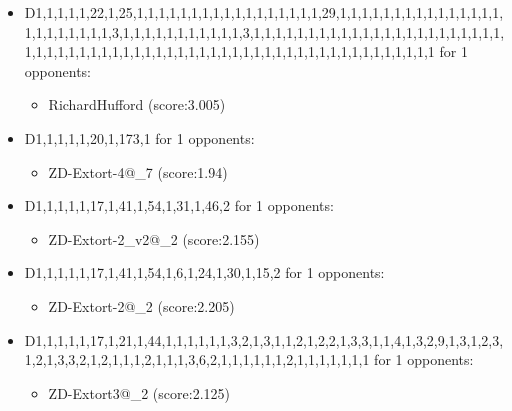 \begin{appendices}
\begin{itemize}
        \item D1,1,1,1,1,22,1,25,1,1,1,1,1,1,1,1,1,1,1,1,1,1,1,1,1,29,1,1,1,1,1,1,1,1,1,1,1,1,1,1,1,1,1,1,1,1,1,1,1,3,1,1,1,1,1,1,1,1,1,1,1,3,1,1,1,1,1,1,1,1,1,1,1,1,1,1,1,1,1,1,1,1,1,1,1,1,1,1,1,1,1,1,1,1,1,1,1,1,1,1,1,1,1,1,1,1,1,1,1,1,1,1,1,1,1,1,1,1,1,1,1,1,1 for 1 opponents:
        \begin{multicols}{3}
            \begin{itemize}
                \item RichardHufford (score:3.005)
            \end{itemize}
        \end{multicols}

        \item D1,1,1,1,1,20,1,173,1 for 1 opponents:
        \begin{multicols}{3}
            \begin{itemize}
                \item ZD-Extort-4@\_7 (score:1.94)
            \end{itemize}
        \end{multicols}

        \item D1,1,1,1,1,17,1,41,1,54,1,31,1,46,2 for 1 opponents:
        \begin{multicols}{3}
            \begin{itemize}
                \item ZD-Extort-2\_v2@\_2 (score:2.155)
            \end{itemize}
        \end{multicols}

        \item D1,1,1,1,1,17,1,41,1,54,1,6,1,24,1,30,1,15,2 for 1 opponents:
        \begin{multicols}{3}
            \begin{itemize}
                \item ZD-Extort-2@\_2 (score:2.205)
            \end{itemize}
        \end{multicols}

        \item D1,1,1,1,1,17,1,21,1,44,1,1,1,1,1,1,3,2,1,3,1,1,2,1,2,2,1,3,3,1,1,4,1,3,2,9,1,3,1,2,3,1,2,1,3,3,2,1,2,1,1,1,2,1,1,1,3,6,2,1,1,1,1,1,1,2,1,1,1,1,1,1,1 for 1 opponents:
        \begin{multicols}{3}
            \begin{itemize}
                \item ZD-Extort3@\_2 (score:2.125)
            \end{itemize}
        \end{multicols}


\end{itemize}
\end{appendices}
